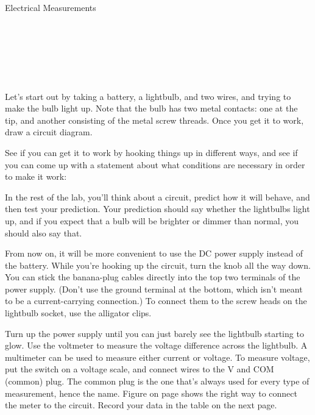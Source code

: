 \begin{lab}{Electrical Measurements}

\apparatus
{}\\
\\
\\
\\
\\



Let's start out by taking a battery, a lightbulb, and two wires, and trying to make
the bulb light up. Note that the bulb has two metal contacts: one at the tip, and another
consisting of the metal screw threads. Once you get it to work, draw a circuit diagram.

\newcommand{\spacefordiagram}{\vspace{40mm}}
\spacefordiagram

See if you can get it to work by hooking things up in different ways, and see if you can
come up with a statement about what conditions are necessary in order to make it work:

\spacefordiagram

In the rest of the lab, you'll think about a circuit, predict how it will behave, and
then test your prediction. Your prediction should say whether the lightbulbs light up,
and if you expect that a bulb will be brighter or dimmer than normal, you should also
say that.


From now on, it will be more convenient to use the DC power supply instead of the battery.
While you're hooking up the circuit, turn the knob all the way down. You can stick the
banana-plug cables directly into the top two terminals of the power supply. (Don't use
the ground terminal at the bottom, which isn't meant to be a current-carrying connection.)
To connect them to the screw heads on the lightbulb socket, use the alligator clips.

Turn up the power supply until you can just barely see the lightbulb starting to glow.
Use the voltmeter to measure the voltage difference across the lightbulb. A multimeter
can be used to measure either current or voltage. To measure voltage, put the switch
on a voltage scale, and connect wires to the V and COM (common) plug. The common plug
is the one that's always used for every type of measurement, hence the name.
Figure
 on page \pageref{fig:voltmeteruseschematic} shows
the right way to connect the meter to the circuit.
Record your data in the table on the next page.


\end{lab}
